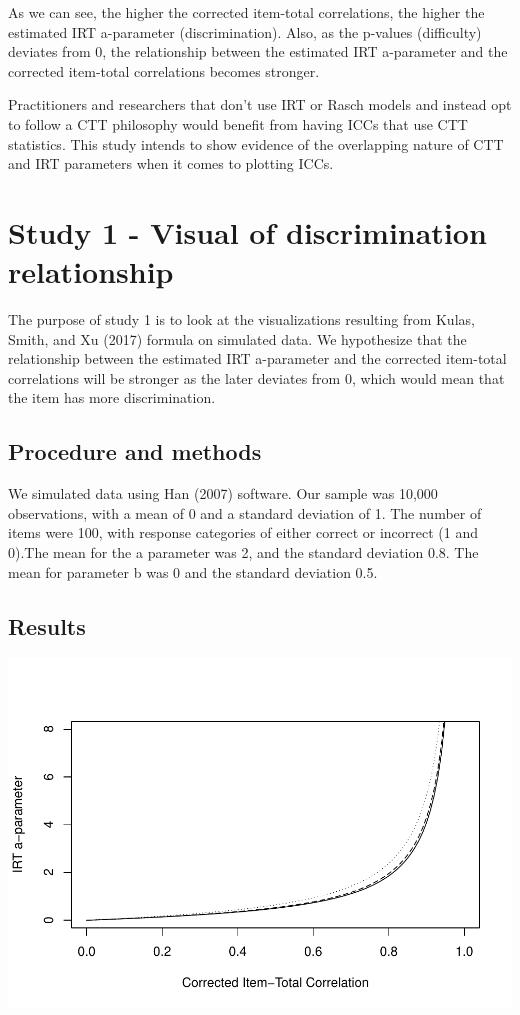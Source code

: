 \documentclass[
  english,
  man,floatsintext]{apa6}
\begin{document}
As we can see, the higher the corrected item-total correlations, the higher the estimated IRT a-parameter (discrimination). Also, as the p-values (difficulty) deviates from 0, the relationship between the estimated IRT a-parameter and the corrected item-total correlations becomes stronger.

Practitioners and researchers that don't use IRT or Rasch models and instead opt to follow a CTT philosophy would benefit from having ICCs that use CTT statistics. This study intends to show evidence of the overlapping nature of CTT and IRT parameters when it comes to plotting ICCs.

\hypertarget{study-1---visual-of-discrimination-relationship}{%
\section{Study 1 - Visual of discrimination relationship}\label{study-1---visual-of-discrimination-relationship}}

The purpose of study 1 is to look at the visualizations resulting from Kulas, Smith, and Xu (2017) formula on simulated data. We hypothesize that the relationship between the estimated IRT a-parameter and the corrected item-total correlations will be stronger as the later deviates from 0, which would mean that the item has more discrimination.

\hypertarget{procedure-and-methods}{%
\subsection{Procedure and methods}\label{procedure-and-methods}}

We simulated data using Han (2007) software. Our sample was 10,000 observations, with a mean of 0 and a standard deviation of 1. The number of items were 100, with response categories of either correct or incorrect (1 and 0).The mean for the a parameter was 2, and the standard deviation 0.8. The mean for parameter b was 0 and the standard deviation 0.5.

\hypertarget{results}{%
\subsection{Results}\label{results}}

\includegraphics{ICC_project_files/figure-latex/acorrected simulation-1.pdf}
\newpage
\end{document}

